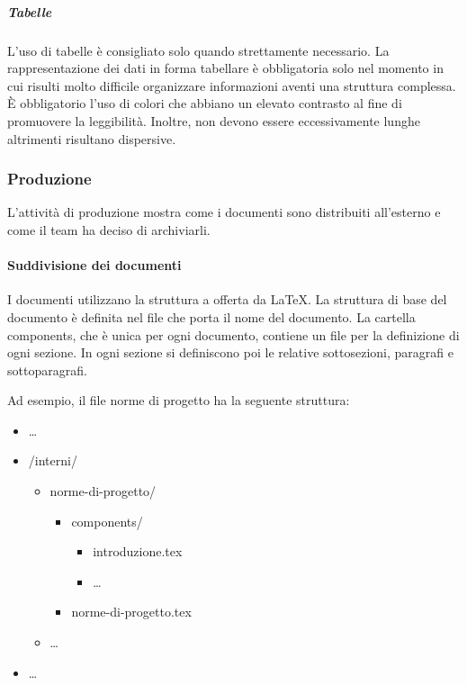 \documentclass[../norme-di-progetto.tex]{subfiles}
\begin{document}
\subparagraph{Tabelle}%
\label{subp:tabelle}
L'uso di tabelle è consigliato solo quando strettamente necessario. La rappresentazione dei dati in forma tabellare è obbligatoria solo nel momento in cui risulti molto difficile organizzare informazioni aventi una struttura complessa. È obbligatorio l'uso di colori che abbiano un elevato contrasto al fine di promuovere la leggibilità. Inoltre, non devono essere eccessivamente lunghe altrimenti risultano dispersive.

\subsubsection{Produzione}%
\label{subs:produzione}

L'attività di produzione mostra come i documenti sono distribuiti all'esterno e come il team ha deciso di archiviarli.

\paragraph{Suddivisione dei documenti}%
\label{par:suddivisione_dei_documenti}
I documenti utilizzano la struttura a  offerta da \LaTeX.
La struttura di base del documento è definita nel file che porta il nome del documento.
La cartella components, che è unica per ogni documento, contiene un file per la definizione di ogni sezione. In ogni sezione si definiscono poi le relative sottosezioni, paragrafi e sottoparagrafi.

Ad esempio, il file norme di progetto ha la seguente struttura:

\begin{itemize}
  \item[] \ldots
  \item[] /interni/
        \begin{itemize}
          \item[] norme-di-progetto/
                \begin{itemize}
                  \item[] components/
                        \begin{itemize}
                          \item[] introduzione.tex
                          \item[] \ldots
                        \end{itemize}
                  \item[] norme-di-progetto.tex
                \end{itemize}
          \item[] \ldots
        \end{itemize}
  \item[] \ldots
\end{itemize}
\end{document}
